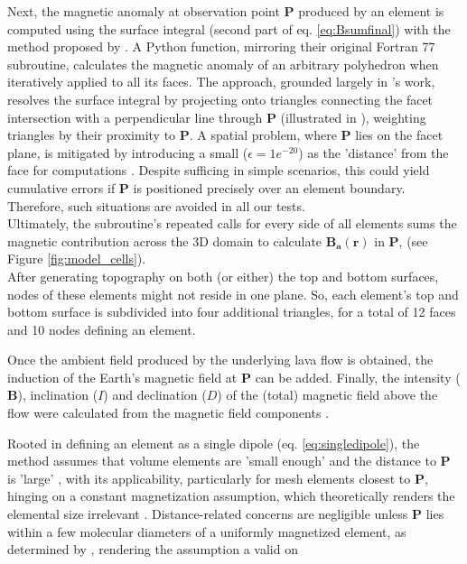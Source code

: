 Next, the magnetic anomaly at observation point \(\mathbf{P}\) produced by an element is computed using the surface integral (second part of eq. \ref{eq:Bsumfinal}) with the method proposed by \cite{BLAKELY}. A Python function, mirroring their original Fortran 77 subroutine, calculates the magnetic anomaly of an arbitrary polyhedron when iteratively applied to all its faces. The approach, grounded largely in \cite{Bott63}'s work, resolves the surface integral by projecting onto triangles connecting the facet intersection with a perpendicular line through \(\mathbf{P}\) (illustrated in \cite{BLAKELY}), weighting triangles by their proximity to \(\mathbf{P}\). A spatial problem, where \(\mathbf{P}\) lies on the facet plane, is mitigated by introducing a small ($\epsilon=1e^{-20}$)  as the 'distance' from the face for computations \parencite{BLAKELY}. Despite sufficing in simple scenarios, this could yield cumulative errors if \(\mathbf{P}\) is positioned precisely over an element boundary. Therefore, such situations are avoided in all our tests. \\Ultimately, the subroutine's repeated calls for every side of all elements sums the magnetic contribution across the 3D domain to calculate \(\mathbf{B_a (r)}\) in \(\mathbf{P}\),  (see Figure \ref{fig:model_cells}). \\
After generating topography on both (or either) the top and bottom surfaces, nodes of these elements might not reside in one plane. So, each element's top and bottom surface is subdivided into four additional triangles, for a total of 12 faces and 10 nodes defining an element. \\
\par Once the ambient field produced by the underlying lava flow is obtained, the induction of the Earth's magnetic field at $\mathbf{P}$ can be added. Finally, the intensity ($\mathbf{B}$), inclination ($I$) and declination ($D$) of the (total) magnetic field above the flow were calculated from the magnetic field components  \parencite{TAUXE}. 

Rooted in defining an element as a single dipole (eq. \ref{eq:singledipole}), the method assumes that volume elements are 'small enough' and the distance to \(\mathbf{P}\) is 'large' \parencite{GRIFFITHS}, with its applicability, particularly for mesh elements closest to \(\mathbf{P}\), hinging on a constant magnetization assumption, which theoretically renders the elemental size irrelevant \parencite{BLAKELY}. Distance-related concerns are negligible unless \(\mathbf{P}\) lies within a few molecular diameters of a uniformly magnetized element, as determined by \parencite{JACKSON}, rendering the assumption a valid on
